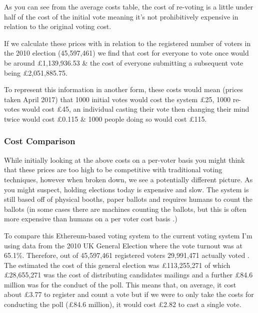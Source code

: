 \documentclass{article}
\begin{document}
	As you can see from the average costs table, the cost of re-voting is a little under half of the cost of the initial vote meaning it's not prohibitively expensive in relation to the original voting cost.
	
	If we calculate these prices with in relation to the registered number of voters in the 2010 election (45,597,461) \citep{69_statistics_from_2010_election} we find that cost for everyone to vote once would be around \pounds1,139,936.53 \& the cost of everyone submitting a subsequent vote being \pounds2,051,885.75. 
	
	To represent this information in another form, these costs would mean (prices taken April 2017) that 1000 initial votes would cost the system \pounds25, 1000 re-votes would cost \pounds45, an individual casting their vote then changing their mind twice would cost \pounds0.115 \& 1000 people doing so would cost \pounds115.

	\subsubsection{Cost Comparison}

	While initially looking at the above costs on a per-voter basis you might think that these prices are too high to be competitive with traditional voting techniques, however when broken down, we see a potentially different picture. As you might suspect, holding elections today is expensive and slow. The system is still based off of physical booths, paper ballots and requires humans to count the ballots (in some cases there are machines counting the ballots, but this is often more expensive than humans on a per voter cost basis \citep{71_arthur_2017}.)

	To compare this Ethereum-based voting system to the current voting system I'm using data from the 2010 UK General Election where the vote turnout was at 65.1\%. Therefore, out of 45,597,461 registered voters 29,991,471 actually voted \citep{72_voter_turnout_at_uk_general_elections}. The estimated the cost of this general election was \pounds113,255,271 \citep{70_what_price_democracy_counting_the_cost_of_uk_elections}  of which \pounds28,655,271 was the cost of distributing candidates mailings and a further \pounds84.6 million was for the conduct of the poll. This means that, on average, it cost about \pounds3.77 to register and count a vote but if we were to only take the costs for conducting the poll (\pounds84.6 million), it would cost \pounds2.82 to cast a single vote.
\end{document}
